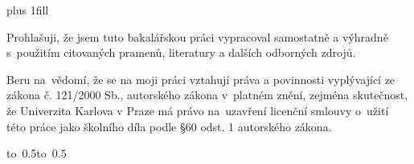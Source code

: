 
\newpage

\vglue 0pt plus 1fill

\noindent
Prohlašuji, že jsem tuto bakalářskou práci vypracoval samostatně a výhradně
s~použitím citovaných pramenů, literatury a dalších odborných zdrojů.

\medskip\noindent
Beru na~vědomí, že se na moji práci vztahují práva a povinnosti vyplývající
ze zákona č. 121/2000 Sb., autorského zákona v~platném znění, zejména skutečnost,
že Univerzita Karlova v Praze má právo na~uzavření licenční smlouvy o~užití této
práce jako školního díla podle §60 odst. 1 autorského zákona.

\vspace{10mm}

\hbox{\hbox to 0.5\hbox to 0.5}

\vspace{20mm}
\newpage


